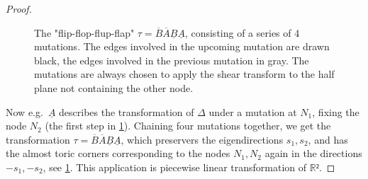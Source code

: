 \documentclass[12pt,a4paper,draft]{scrartcl}
\begin{document}
\begin{proof}
\begin{figure}
    \caption{The "flip-flop-flup-flap" $τ = \overline{B} \overline{A} \underline{B} \underline{A}$, consisting of a series of 4 mutations.
The edges involved in the upcoming mutation are drawn black, the edges involved in the previous mutation in gray.
The mutations are always chosen to apply the shear transform to the half plane not containing the other node.}
    \label{fig:flip-flop-flup-flap}
  \end{figure}

  Now e.g.\ $\underline{A}$ describes the transformation of $Δ$ under a mutation at $N_1$, fixing the node $N_2$ (the first step in \cref{fig:flip-flop-flup-flap}).
  Chaining four mutations together, we get the transformation $τ = \overline{B} \overline{A} \underline{B} \underline{A}$, which preservers the eigendirections $s_1,s_2$, and has the almost toric corners corresponding to the nodes $N_1,N_2$ again in the directions $-s_1,-s_2$, see \cref{fig:flip-flop-flup-flap}.
  This application is piecewise linear transformation of $ℝ²$.


\end{proof}
\end{document}
